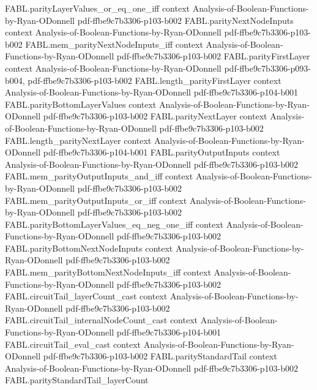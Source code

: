 \begin{theorem}
\proofstep
  {FABL.parityLayerValues_or_eq_one_iff}
  {context}
  {Analysis-of-Boolean-Functions-by-Ryan-ODonnell}
  {pdf-ffbe9c7b3306-p103-b002}
\proofstep
  {FABL.parityNextNodeInputs}
  {context}
  {Analysis-of-Boolean-Functions-by-Ryan-ODonnell}
  {pdf-ffbe9c7b3306-p103-b002}
\proofstep
  {FABL.mem_parityNextNodeInputs_iff}
  {context}
  {Analysis-of-Boolean-Functions-by-Ryan-ODonnell}
  {pdf-ffbe9c7b3306-p103-b002}
\proofstep
  {FABL.parityFirstLayer}
  {context}
  {Analysis-of-Boolean-Functions-by-Ryan-ODonnell}
  {pdf-ffbe9c7b3306-p093-b004,
    pdf-ffbe9c7b3306-p103-b002}
\proofstep
  {FABL.length_parityFirstLayer}
  {context}
  {Analysis-of-Boolean-Functions-by-Ryan-ODonnell}
  {pdf-ffbe9c7b3306-p104-b001}
\proofstep
  {FABL.parityBottomLayerValues}
  {context}
  {Analysis-of-Boolean-Functions-by-Ryan-ODonnell}
  {pdf-ffbe9c7b3306-p103-b002}
\proofstep
  {FABL.parityNextLayer}
  {context}
  {Analysis-of-Boolean-Functions-by-Ryan-ODonnell}
  {pdf-ffbe9c7b3306-p103-b002}
\proofstep
  {FABL.length_parityNextLayer}
  {context}
  {Analysis-of-Boolean-Functions-by-Ryan-ODonnell}
  {pdf-ffbe9c7b3306-p104-b001}
\proofstep
  {FABL.parityOutputInputs}
  {context}
  {Analysis-of-Boolean-Functions-by-Ryan-ODonnell}
  {pdf-ffbe9c7b3306-p103-b002}
\proofstep
  {FABL.mem_parityOutputInputs_and_iff}
  {context}
  {Analysis-of-Boolean-Functions-by-Ryan-ODonnell}
  {pdf-ffbe9c7b3306-p103-b002}
\proofstep
  {FABL.mem_parityOutputInputs_or_iff}
  {context}
  {Analysis-of-Boolean-Functions-by-Ryan-ODonnell}
  {pdf-ffbe9c7b3306-p103-b002}
\proofstep
  {FABL.parityBottomLayerValues_eq_neg_one_iff}
  {context}
  {Analysis-of-Boolean-Functions-by-Ryan-ODonnell}
  {pdf-ffbe9c7b3306-p103-b002}
\proofstep
  {FABL.parityBottomNextNodeInputs}
  {context}
  {Analysis-of-Boolean-Functions-by-Ryan-ODonnell}
  {pdf-ffbe9c7b3306-p103-b002}
\proofstep
  {FABL.mem_parityBottomNextNodeInputs_iff}
  {context}
  {Analysis-of-Boolean-Functions-by-Ryan-ODonnell}
  {pdf-ffbe9c7b3306-p103-b002}
\proofstep
  {FABL.circuitTail_layerCount_cast}
  {context}
  {Analysis-of-Boolean-Functions-by-Ryan-ODonnell}
  {pdf-ffbe9c7b3306-p103-b002}
\proofstep
  {FABL.circuitTail_internalNodeCount_cast}
  {context}
  {Analysis-of-Boolean-Functions-by-Ryan-ODonnell}
  {pdf-ffbe9c7b3306-p104-b001}
\proofstep
  {FABL.circuitTail_eval_cast}
  {context}
  {Analysis-of-Boolean-Functions-by-Ryan-ODonnell}
  {pdf-ffbe9c7b3306-p103-b002}
\proofstep
  {FABL.parityStandardTail}
  {context}
  {Analysis-of-Boolean-Functions-by-Ryan-ODonnell}
  {pdf-ffbe9c7b3306-p103-b002}
\proofstep
  {FABL.parityStandardTail_layerCount}

\end{theorem}
